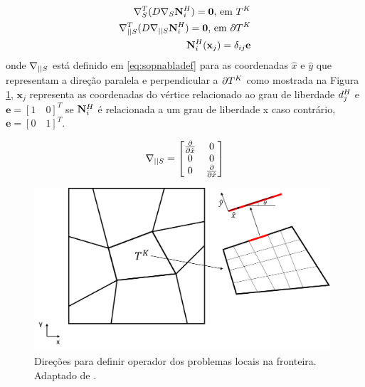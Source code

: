 \begin{subequations} \label{eq:problemaslocais}
\begin{align}
\sopnabla ^T (D \sopnabla \basefunctioncoarse)  = \mathbf{0} \text{,   em   } \coarseelement \label{eq:operadorlocal}\\
\sopnablafront ^ T ( D  \sopnablafront \basefunctioncoarse) = \mathbf{0}  \text{,   em   } \partial \coarseelement  \label{eq:operadoraresta}\\
\basefunctioncoarse(\mathbf{x}_j) = \delta_{ij} \mathbf{e}
\label{eq:valorvertice}
\end{align}
\end{subequations}
onde $\sopnablafront$ está definido em \eqref{eq:sopnabladef} para as coordenadas $\hat{x}$ e $\hat{y}$ que representam a direção paralela e perpendicular a $\partial \coarseelement$ como mostrada na Figura \ref{fig:direcoesoperadorfronteira}, $\mathbf{x}_j$ representa as coordenadas do vértice relacionado ao grau de liberdade $\freedomcoarse[j]$ e  $\mathbf{e} = [1\quad0]^T $ se $\basefunctioncoarse$ é relacionada a um grau de liberdade x caso contrário,  $\mathbf{e}=[0\quad1]^T$.

\begin{equation}\label{eq:sopnabladef}
\sopnablafront = \begin{bmatrix}
\dxhat  & 0 \\ 
0 & 0 \\ 
0 & \dxhat 
\end{bmatrix}
\end{equation}


\begin{figure}[!htbp]
\centering
\includegraphics[width=11cm]{chap06/figs/direcoesoperadorfronteira.png}
\caption{Direções para definir operador dos problemas locais na fronteira. Adaptado de \cite{casteletto}.}
\label{fig:direcoesoperadorfronteira}
\end{figure}


